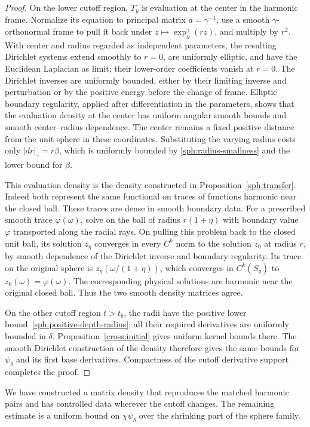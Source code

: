 \begin{proof}
On the lower cutoff region, $T_y$ is evaluation at the center in the
harmonic frame.  Normalize its equation to principal matrix
$a=\gamma^{-1}$, use a smooth $\gamma$-orthonormal frame to pull it
back under $z\mapsto\exp_y^\gamma(rz)$, and multiply by $r^2$.
With center and radius regarded as independent parameters,
the resulting Dirichlet systems extend smoothly to $r=0$, are uniformly
elliptic, and have the Euclidean Laplacian as limit; their lower-order
coefficients vanish at $r=0$.  The Dirichlet inverses are uniformly
bounded, either by their limiting inverse and perturbation or by the
positive energy before the change of frame.  Elliptic boundary
regularity, applied after differentiation in the parameters, shows
that the evaluation density at the center has uniform angular smooth
bounds and smooth center--radius dependence.  The center remains a
fixed positive distance from the unit sphere in these coordinates.
Substituting the varying radius costs only
$|dr|_\gamma=r\beta$, which is uniformly bounded by
\eqref{sph:radius-smallness} and the lower bound for $\beta$.

This evaluation density is the density constructed in
Proposition~\ref{sph:transfer}.  Indeed both represent the same
functional on traces of functions harmonic near the closed ball.
These traces are dense in smooth boundary data.  For a prescribed
smooth trace $\varphi(\omega)$, solve on the ball of radius
$r(1+\eta)$ with boundary value $\varphi$ transported along the radial
rays.  On pulling this problem back to the closed unit ball, its
solution $z_\eta$ converges in every $C^k$ norm to the solution $z_0$
at radius $r$, by smooth dependence of the Dirichlet inverse and
boundary regularity.  Its trace on the original sphere is
$z_\eta(\omega/(1+\eta))$, which converges in $C^k(S_y)$ to
$z_0(\omega)=\varphi(\omega)$.  The corresponding physical solutions
are harmonic near the original closed ball.  Thus the two smooth
density matrices agree.

On the other cutoff region $t>t_b$, the radii have the positive lower
bound~\eqref{sph:positive-depth-radius}; all their required derivatives
are uniformly bounded in $\delta$.  Proposition~\ref{cross:initial}
gives uniform kernel bounds there.  The smooth Dirichlet construction
of the density therefore gives the same bounds for $\psi_\delta$ and
its first base derivatives.  Compactness of the cutoff derivative
support completes the proof.
\end{proof}

We have constructed a matrix density that reproduces the matched
harmonic pairs and has controlled data wherever the cutoff changes.
The remaining estimate is a uniform bound on $\chi\psi_\delta$ over
the shrinking part of the sphere family.

